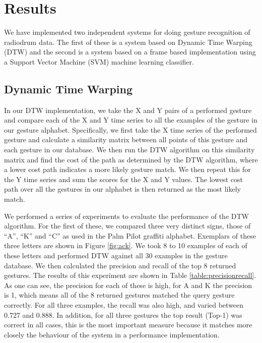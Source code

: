 \documentclass[twoside,10pt,a4paper]{article}
\begin{document}
\section{Results}

We have implemented two independent systems for doing gesture
recognition of radiodrum data.  The first of these is a system based
on Dynamic Time Warping (DTW) \cite{darrell93} and the second is a
system based on a frame based implementation using a Support Vector
Machine (SVM) machine learning classifier.

\subsection{Dynamic Time Warping}

In our DTW implementation, we take the X and Y pairs of a performed
gesture and compare each of the X and Y time series to all the
examples of the gesture in our gesture alphabet.  Specifically, we
first take the X time series of the performed gesture and calculate a
similarity matrix between all points of this gesture and each gesture
in our database.  We then run the DTW algorithm on this
similarity matrix and find the cost of the path as determined by the
DTW algorithm, where a lower cost path indicates a more likely gesture
match.  We then repeat this for the Y time series and sum the scores
for the X and Y values.  The lowest cost path over all the gestures in
our alphabet is then returned as the most likely match.

We performed a series of experiments to evaluate the performance of
the DTW algorithm.  For the first of these, we compared three very
distinct signs, those of ``A'', ``K'' and ``C'' as used in the Palm
Pilot graffiti alphabet.  Exemplars of these three letters are shown
in Figure \ref{fig:ack}.  We took 8 to 10 examples of each of these
letters and performed DTW against all 30 examples in the gesture
database.  We then calculated the precision and recall of the top 8
returned gestures.  The results of this experiment are shown in Table
\ref{table:precisionrecall}.  As one can see, the precision for each
of these is high, for A and K the precision is 1, which means all of
the 8 returned gestures matched the query gesture correctly.  For all
three examples, the recall was also high, and varied between 0.727 and
0.888.  In addition, for all three gestures the top result (Top-1) was
correct in all cases, this is the most important measure because it
matches more closely the behaviour of the system in a performance
implementation.
\end{document}
